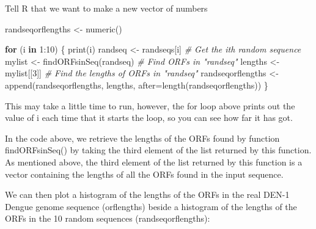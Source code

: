 \documentclass[
]{book}
\newenvironment{Shaded}{\begin{snugshade}}{\end{snugshade}}
\newcommand{\AttributeTok}[1]{\textcolor[rgb]{0.77,0.63,0.00}{#1}}
\newcommand{\CommentTok}[1]{\textcolor[rgb]{0.56,0.35,0.01}{\textit{#1}}}
\newcommand{\ControlFlowTok}[1]{\textcolor[rgb]{0.13,0.29,0.53}{\textbf{#1}}}
\newcommand{\DecValTok}[1]{\textcolor[rgb]{0.00,0.00,0.81}{#1}}
\newcommand{\FunctionTok}[1]{\textcolor[rgb]{0.00,0.00,0.00}{#1}}
\newcommand{\NormalTok}[1]{#1}
\newcommand{\OtherTok}[1]{\textcolor[rgb]{0.56,0.35,0.01}{#1}}
\newcommand{\SpecialCharTok}[1]{\textcolor[rgb]{0.00,0.00,0.00}{#1}}
\begin{document}
Tell R that we want to make a new vector of numbers

\begin{Shaded}
\begin{Highlighting}[]
\NormalTok{randseqorflengths }\OtherTok{\textless{}{-}} \FunctionTok{numeric}\NormalTok{()            }
\end{Highlighting}
\end{Shaded}

\begin{Shaded}
\begin{Highlighting}[]
\ControlFlowTok{for}\NormalTok{ (i }\ControlFlowTok{in} \DecValTok{1}\SpecialCharTok{:}\DecValTok{10}\NormalTok{)}
\NormalTok{  \{}
     \FunctionTok{print}\NormalTok{(i)}
\NormalTok{     randseq }\OtherTok{\textless{}{-}}\NormalTok{ randseqs[i]                     }\CommentTok{\# Get the ith random sequence}
\NormalTok{     mylist }\OtherTok{\textless{}{-}} \FunctionTok{findORFsinSeq}\NormalTok{(randseq)           }\CommentTok{\# Find ORFs in "randseq"}
\NormalTok{     lengths }\OtherTok{\textless{}{-}}\NormalTok{ mylist[[}\DecValTok{3}\NormalTok{]]                     }\CommentTok{\# Find the lengths of ORFs in "randseq"}
\NormalTok{     randseqorflengths }\OtherTok{\textless{}{-}} \FunctionTok{append}\NormalTok{(randseqorflengths, lengths, }\AttributeTok{after=}\FunctionTok{length}\NormalTok{(randseqorflengths))}
\NormalTok{  \}}
\end{Highlighting}
\end{Shaded}

This may take a little time to run, however, the for loop above prints out the value of i each time that it starts the loop, so you can see how far it has got.

In the code above, we retrieve the lengths of the ORFs found by function findORFsinSeq() by taking the third element of the list returned by this function. As mentioned above, the third element of the list returned by this function is a vector containing the lengths of all the ORFs found in the input sequence.

We can then plot a histogram of the lengths of the ORFs in the real DEN-1 Dengue genome sequence (orflengths) beside a histogram of the lengths of the ORFs in the 10 random sequences (randseqorflengths):
\end{document}
